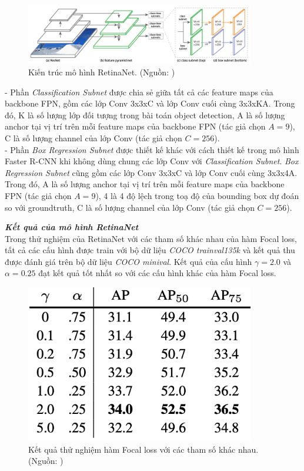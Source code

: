 {    \begin{figure}[H]
        \centering
        \includegraphics[width=10cm] {images/retinanet_model}
        \caption{Kiến trúc mô hình RetinaNet. (Nguồn: \cite{lin2017focal})}
        \label{fig:retinanet_model}
    \end{figure}

    \noindent
    - Phần \textit{Classification Subnet} được chia sẻ giữa tất cả các feature maps của backbone FPN, gồm các lớp Conv 3x3xC và lớp Conv cuối cùng 3x3xKA.
    Trong đó, K là số lượng lớp đối tượng trong bài toán object detection, A là số lượng anchor tại vị trí trên mỗi feature maps của backbone FPN (tác giả chọn $A = 9$), C là số lượng channel của lớp Conv (tác giả chọn $C = 256$). \\
    - Phần \textit{Box Regression Subnet} được thiết kế khác với cách thiết kế trong mô hình Faster R-CNN khi không dùng chung các lớp Conv với \textit{Classification Subnet}.
    \textit{Box Regression Subnet} cũng gồm các lớp Conv 3x3xC và lớp Conv cuối cùng 3x3x4A.
    Trong đó, A là số lượng anchor tại vị trí trên mỗi feature maps của backbone FPN (tác giả chọn $A = 9$), 4 là 4 độ lệch trong toạ độ của bounding box dự đoán so với groundtruth, C là số lượng channel của lớp Conv (tác giả chọn $C = 256$).

    \noindent
    \textbf{\textit{Kết quả của mô hình RetinaNet}} \\
    Trong thử nghiệm của RetinaNet với các tham số khác nhau của hàm Focal loss, tất cả các cấu hình được train với bộ dữ liệu \textit{COCO trainval135k} và kết quả thu được đánh giá trên bộ dữ liệu \textit{COCO minival}.
    Kết quả của cấu hình $\gamma = 2.0$ và $\alpha = 0.25$ đạt kết quả tốt nhất so với các cấu hình khác của hàm Focal loss.

    \begin{figure}[H]
        \centering
        \includegraphics[width=10cm] {images/retinanet_results_2}
        \caption{Kết quả thử nghiệm hàm Focal loss với các tham số khác nhau. (Nguồn: \cite{lin2017focal})}
        \label{fig:retinanet_results_2}
    \end{figure}

}
